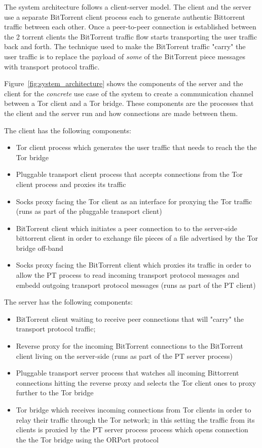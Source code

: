 \documentclass[11pt]{article} %
\begin{document}
The system architecture follows a client-server model. The client and the server use a separate BitTorrent client process each to generate authentic Bittorrent traffic between each other. Once a peer-to-peer connection is established between the 2 torrent clients the BitTorrent traffic flow starts transporting the user traffic back and forth. The technique used to make the BitTorrent traffic "carry" the user traffic is to replace the payload of \textit{some} of the BitTorrent piece messages with transport protocol traffic. 


Figure~\ref{fig:system_architecture} shows the components of the server and the client for the \textit{concrete} use case of the system to create a communication channel between a Tor client and a Tor bridge. These components are the processes that the client and the server run and how connections are made between them.

The client has the following components:

\begin{itemize}
\item Tor client process which generates the user traffic that needs to reach the the Tor bridge
\item Pluggable transport client process that accepts connections from the Tor client process and proxies its traffic
\item Socks proxy facing the Tor client as an interface for proxying the Tor traffic (runs as part of the pluggable transport client) 
\item BitTorrent client which initiates a peer connection to to the server-side bittorrent client in order to exchange file pieces of a file advertised by the Tor bridge off-band
\item Socks proxy facing the BitTorrent client which proxies its traffic in order to allow the PT process to read   incoming transport protocol messages and embedd outgoing transport protocol messages (runs as part of the PT client) 
\end{itemize}

The server has the following components:

\begin{itemize}

\item BitTorrent client waiting to receive peer connections that will "carry" the transport protocol traffic; 
\item Reverse proxy for the incoming BitTorrent connections to the BitTorrent client living on the server-side (runs as part of the PT server process)
\item Pluggable transport server process that watches all incoming Bittorrent connections hitting the reverse proxy and selects the Tor client ones to proxy further to the Tor bridge
\item Tor bridge which receives incoming connections from Tor clients in order to relay their traffic through the Tor network; in this setting the traffic from its clients is proxied by the PT server process process which opens connection the the Tor bridge using the ORPort protocol

\end{itemize}
\end{document}
